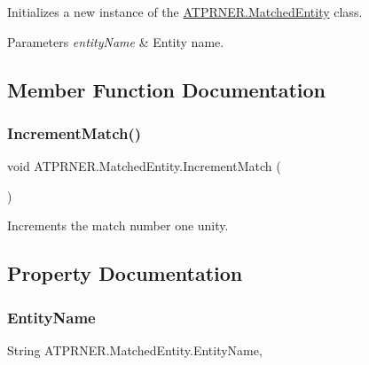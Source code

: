 Initializes a new instance of the \hyperlink{class_a_t_p_r_n_e_r_1_1_matched_entity}{A\+T\+P\+R\+N\+E\+R.\+Matched\+Entity} class. 


\begin{DoxyParams}{Parameters}
{\em entity\+Name} & Entity name.\\
\hline
\end{DoxyParams}


\subsection{Member Function Documentation}
\hypertarget{class_a_t_p_r_n_e_r_1_1_matched_entity_ae6fa09ea42c0787d4279ceb5076c5f14}{}\label{class_a_t_p_r_n_e_r_1_1_matched_entity_ae6fa09ea42c0787d4279ceb5076c5f14} 
\subsubsection{\texorpdfstring{Increment\+Match()}{IncrementMatch()}}
{\footnotesize\ttfamily void A\+T\+P\+R\+N\+E\+R.\+Matched\+Entity.\+Increment\+Match (\begin{DoxyParamCaption}{ }\end{DoxyParamCaption})\hspace{0.3cm}{\ttfamily [inline]}}



Increments the match number one unity. 



\subsection{Property Documentation}
\hypertarget{class_a_t_p_r_n_e_r_1_1_matched_entity_a42a05257a07b5d089ac070b1d9e5461a}{}\label{class_a_t_p_r_n_e_r_1_1_matched_entity_a42a05257a07b5d089ac070b1d9e5461a} 
\subsubsection{\texorpdfstring{Entity\+Name}{EntityName}}
{\footnotesize\ttfamily String A\+T\+P\+R\+N\+E\+R.\+Matched\+Entity.\+Entity\+Name\hspace{0.3cm}{\ttfamily [get]}, {\ttfamily [set]}}



